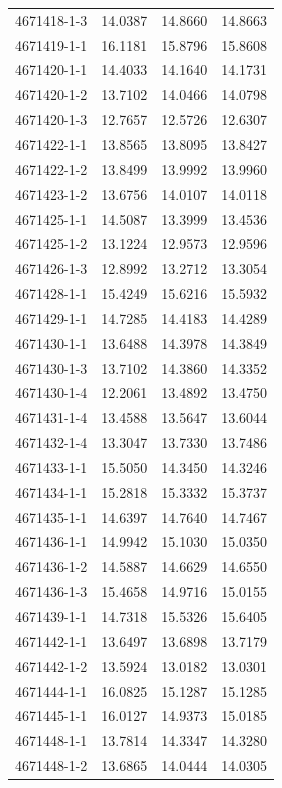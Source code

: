 \begin{longtable}{lrrr}
4671418-1-3 & 14.0387 & 14.8660 & 14.8663 \\
4671419-1-1 & 16.1181 & 15.8796 & 15.8608 \\
4671420-1-1 & 14.4033 & 14.1640 & 14.1731 \\
4671420-1-2 & 13.7102 & 14.0466 & 14.0798 \\
4671420-1-3 & 12.7657 & 12.5726 & 12.6307 \\
4671422-1-1 & 13.8565 & 13.8095 & 13.8427 \\
4671422-1-2 & 13.8499 & 13.9992 & 13.9960 \\
4671423-1-2 & 13.6756 & 14.0107 & 14.0118 \\
4671425-1-1 & 14.5087 & 13.3999 & 13.4536 \\
4671425-1-2 & 13.1224 & 12.9573 & 12.9596 \\
4671426-1-3 & 12.8992 & 13.2712 & 13.3054 \\
4671428-1-1 & 15.4249 & 15.6216 & 15.5932 \\
4671429-1-1 & 14.7285 & 14.4183 & 14.4289 \\
4671430-1-1 & 13.6488 & 14.3978 & 14.3849 \\
4671430-1-3 & 13.7102 & 14.3860 & 14.3352 \\
4671430-1-4 & 12.2061 & 13.4892 & 13.4750 \\
4671431-1-4 & 13.4588 & 13.5647 & 13.6044 \\
4671432-1-4 & 13.3047 & 13.7330 & 13.7486 \\
4671433-1-1 & 15.5050 & 14.3450 & 14.3246 \\
4671434-1-1 & 15.2818 & 15.3332 & 15.3737 \\
4671435-1-1 & 14.6397 & 14.7640 & 14.7467 \\
4671436-1-1 & 14.9942 & 15.1030 & 15.0350 \\
4671436-1-2 & 14.5887 & 14.6629 & 14.6550 \\
4671436-1-3 & 15.4658 & 14.9716 & 15.0155 \\
4671439-1-1 & 14.7318 & 15.5326 & 15.6405 \\
4671442-1-1 & 13.6497 & 13.6898 & 13.7179 \\
4671442-1-2 & 13.5924 & 13.0182 & 13.0301 \\
4671444-1-1 & 16.0825 & 15.1287 & 15.1285 \\
4671445-1-1 & 16.0127 & 14.9373 & 15.0185 \\
4671448-1-1 & 13.7814 & 14.3347 & 14.3280 \\
4671448-1-2 & 13.6865 & 14.0444 & 14.0305 \\

\end{longtable}
